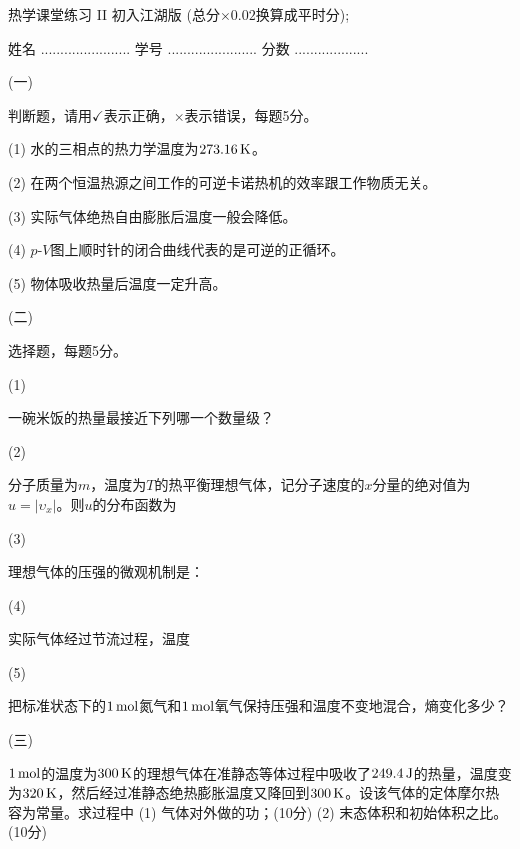 \documentclass[12pt,CJK]{article}
\begin{document}
\bch
{\large 热学课堂练习 II 初入江湖版 (总分$\times 0.02$换算成平时分);}


姓名 ....................... {\hskip 0.5in}    学号 .......................{\hskip 0.5in}  分数 ...................


\bitem
\item[(一)]{判断题，请用$\checkmark$表示正确，$\times$表示错误，每题5分。

  \bitem
\item[(1)]{水的三相点的热力学温度为$273.16\,\mathrm{K}$。\bropt}
\item[(2)]{在两个恒温热源之间工作的可逆卡诺热机的效率跟工作物质无关。\bropt}
\item[(3)]{实际气体绝热自由膨胀后温度一般会降低。 \bropt}  
\item[(4)]{$p$-$V$图上顺时针的闭合曲线代表的是可逆的正循环。\bropt}
\item[(5)]{物体吸收热量后温度一定升高。\bropt}
  \eitem
}

\item[(二)]{选择题，每题5分。

  \bitem
  \item[(1)]{
    一碗米饭的热量最接近下列哪一个数量级？ \bropt


}

\item[(2)]{分子质量为$m$，温度为$T$的热平衡理想气体，记分子速度的$x$分量的绝对值为$u = |\upsilon_x|$。则$u$的分布函数为 \bropt
  

}

\item[(3)]{理想气体的压强的微观机制是： \bropt

}

\item[(4)]{实际气体经过节流过程，温度 \bropt

  
}

\item[(5)]{
  把标准状态下的$1\,\mathrm{mol}$氮气和$1\,\mathrm{mol}$氧气保持压强和温度不变地混合，熵变化多少？ \bropt

}


  \eitem
  }
\item[(三)]{$1\,\mathrm{mol}$的温度为$300\,\mathrm{K}$的理想气体在准静态等体过程中吸收了$249.4\,\mathrm{J}$的热量，温度变为$320\,\mathrm{K}$，然后经过准静态绝热膨胀温度又降回到$300\,\mathrm{K}$。设该气体的定体摩尔热容为常量。求过程中 (1) 气体对外做的功；(10分) (2) 末态体积和初始体积之比。(10分) 

    \vspace{3.8in}


}
\end{document}
